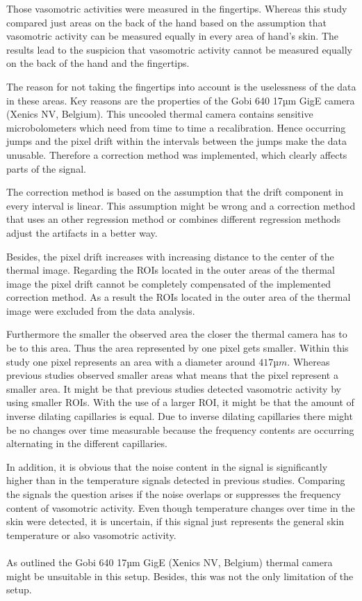 Those vasomotric activities were measured in the fingertips. Whereas this study compared just areas on the back of the hand based on the assumption that vasomotric activity can be measured equally in every area of hand's skin. The results lead to the suspicion that vasomotric activity cannot be measured equally on the back of the hand and the fingertips.

The reason for not taking the fingertips into account is the uselessness of the data in these areas. Key reasons are the properties of the Gobi 640 17µm GigE camera (Xenics NV, Belgium). This uncooled thermal camera contains sensitive  microbolometers which need from time to time a recalibration. Hence occurring jumps and the pixel drift within the intervals between the jumps make the data unusable. Therefore a correction method was implemented, which clearly affects parts of the signal.

The correction method is based on the assumption that the drift component in every interval is linear. This assumption might be wrong and a correction method that uses an other regression method or combines different regression methods adjust the artifacts in a better way. 

Besides, the pixel drift increases with increasing distance to the center of the thermal image. Regarding the ROIs located in the outer areas of the thermal image the pixel drift cannot be completely compensated of the implemented correction method. As a result the ROIs located in the outer area of the thermal image were excluded from the data analysis. %

Furthermore the smaller the observed area the closer the thermal camera has to be to this area. Thus the area represented by one pixel gets smaller. Within this study one pixel represents an area with a diameter around $417µm$. Whereas previous studies observed smaller areas what means that the pixel represent a smaller area.
It might be that previous studies detected vasomotric activity by using smaller ROIs. With the use of a larger ROI, it might be that the amount of inverse dilating capillaries is equal. Due to inverse dilating capillaries there might be no changes over time measurable because the frequency contents are occurring alternating in the different capillaries.

In addition, it is obvious that the noise content in the signal is significantly higher than in the temperature signals detected in previous studies. Comparing the signals the question arises if the noise overlaps or suppresses the frequency content of vasomotric activity. Even though temperature changes over time in the skin were detected, it is uncertain, if this signal just represents the general skin temperature or also vasomotric activity. %
\\
\\
As outlined the Gobi 640 17µm GigE (Xenics NV, Belgium) thermal camera might be unsuitable in this setup. Besides, this was not the only limitation of the setup.

